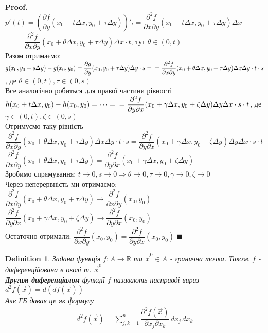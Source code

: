 \documentclass[a4paper, 14pt]{extarticle}
\def\departial#1#2{\dfrac{\partial {#1}}{\partial {#2}}}
\def\bigline{\vspace{5mm}\\}
\theoremstyle{theoremdd}
\theoremstyle{theoremdd}
\newtheorem{definition}[theorem]{Definition}
\theoremstyle{theoremdd}
\theoremstyle{theoremdd}
\theoremstyle{theoremdd}
\theoremstyle{theoremdd}
\theoremstyle{theoremdd}
\newenvironment{pf}{\vspace*{-3mm} \textbf{Proof. \\}}{$\blacksquare$}
\begin{document}
\begin{pf}
$p'(t)= \left(\departial{f}{y}(x_0+t\Delta x, y_0+\tau \Delta y) \right)'_t = \dfrac{\partial^2 f}{\partial x \partial y} (x_0 + t \Delta x, y_0 + \tau \Delta y) \Delta x$\\
$\boxed{=} = \dfrac{\partial^2 f}{\partial x \partial y} (x_0+\theta \Delta x, y_0 + \tau \Delta y) \Delta x \cdot t$, тут $\theta \in (0,t)$\\
Разом отримаємо:\\
$g(x_0,y_0+s\Delta y) - g(x_0,y_0) = \departial{g}{y}(x_0,y_0+\tau \Delta y) \Delta y \cdot s = \\ = \dfrac{\partial^2 f}{\partial x \partial y} (x_0+\theta \Delta x, y_0 + \tau \Delta y) \Delta x \Delta y \cdot t \cdot s$, де $\theta \in (0,t), \tau \in (0,s)$
\bigline
Все аналогічно робиться для правої частини рівності\\
$h(x_0+t\Delta x, y_0) - h(x_0,y_0) = \cdots = \\ = \dfrac{\partial^2 f}{\partial y \partial x} (x_0 + \gamma \Delta x, y_0 + \zeta \Delta y) \Delta y \Delta x \cdot s \cdot t$, де $\gamma \in (0,t), \zeta \in (0,s)$
\bigline
Отримуємо таку рівність\\
$\dfrac{\partial^2 f}{\partial x \partial y} (x_0+\theta \Delta x, y_0 + \tau \Delta y) \Delta x \Delta y \cdot t \cdot s = \dfrac{\partial^2 f}{\partial y \partial x} (x_0 + \gamma \Delta x, y_0 + \zeta \Delta y) \Delta y \Delta x \cdot s \cdot t$\\
$\dfrac{\partial^2 f}{\partial x \partial y} (x_0+\theta \Delta x, y_0 + \tau \Delta y) = \dfrac{\partial^2 f}{\partial y \partial x} (x_0 + \gamma \Delta x, y_0 + \zeta \Delta y)$\\
Зробимо спрямування: $t \to 0, s \to 0 \Rightarrow \theta \to 0, \tau \to 0, \gamma \to 0, \zeta \to 0$\\
Через неперервність ми отримаємо:\\
$\dfrac{\partial^2 f}{\partial x \partial y} (x_0+\theta \Delta x, y_0 + \tau \Delta y) \to \dfrac{\partial^2 f}{\partial x \partial y}(x_0,y_0)$\\
$\dfrac{\partial^2 f}{\partial y \partial x} (x_0 + \gamma \Delta x, y_0 + \zeta \Delta y) \to \dfrac{\partial^2 f}{\partial y \partial x}(x_0,y_0)$\\
Остаточно отримали: $\dfrac{\partial^2 f}{\partial x \partial y}(x_0,y_0) = \dfrac{\partial^2 f}{\partial y \partial x}(x_0,y_0)$
\end{pf}

\begin{definition}
Задана функція $f: A \to \mathbb{R}$ та $\vec{x}^0 \in A$ - гранична точка. Також $f$ - диференційована в околі т. $\vec{x}^0$\\
\textbf{Другим диференціалом} функції $f$ називають насправді вираз $d^2f(\vec{x}) = d(df(\vec{x}))$\\
Але ГБ давав це як формулу
\begin{align*}
d^2 f(\vec{x}) = \sum_{j,k=1}^n \dfrac{\partial^2 f(\vec{x})}{\partial x_j \partial x_k} \,dx_j \,dx_k
\end{align*}
\end{definition}
\end{document}

